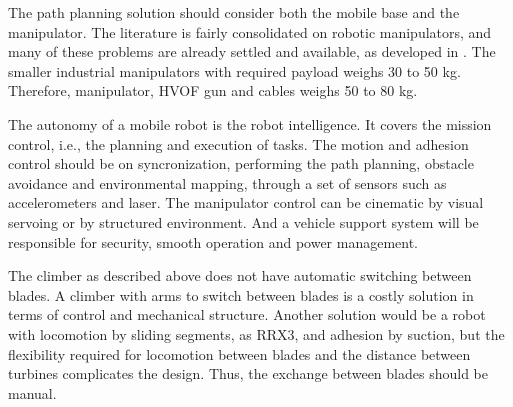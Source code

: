 The path planning solution should consider both the mobile base and the
manipulator. The literature is fairly consolidated on robotic manipulators, and
many of these problems are already settled and available, as developed in
\cite{manzdevelopment}. The smaller industrial manipulators with required
payload weighs 30 to 50 kg. Therefore, manipulator, HVOF gun and cables weighs
50 to 80 kg.



The autonomy of a mobile robot is the robot intelligence. It covers the mission
control, i.e., the planning and execution of tasks. The motion and adhesion
control should be on syncronization, performing the path planning, obstacle
avoidance and environmental mapping, through a set of sensors such as
accelerometers and laser. The manipulator control can be cinematic by visual
servoing or by structured environment. And a vehicle support system will be
responsible for security, smooth operation and power management.



The climber as described above does not have automatic switching between blades.
A climber with arms to switch between blades is a costly solution in terms
of control and mechanical structure. Another solution would be a robot with
locomotion by sliding segments, as RRX3, and adhesion by suction, but the
flexibility required for locomotion between blades and the distance between
turbines complicates the design. Thus, the exchange between blades should be
manual.

